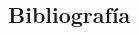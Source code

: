 \documentclass[11pt, a4paper, twoside]{article}
\begin{document}
\begin{TP1}
	\subsection{Bibliografía}
	\begin{thebibliography}{99}
%	

	\end{thebibliography}
	
	\clearpage{\pagestyle{empty}\clearpage} %

\end{TP1}
\end{document}
